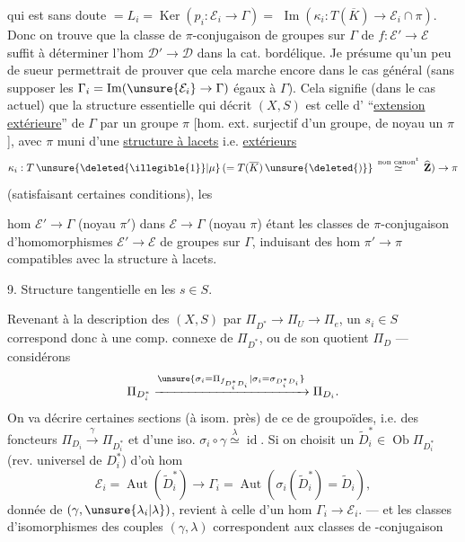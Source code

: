 
qui est sans doute $=L_i=\operatorname{Ker}(p_i:\mathcal{E}_i\to\Gamma)=$  $\operatorname{Im}(\kappa_i:T(\overline{K})\to\mathcal{E}_i\cap\pi)$.
Donc on trouve que  la classe de  $\pi$-conjugaison de groupes sur $\Gamma$ de $f:\mathcal{E}'\to\mathcal{E}$ suffit à déterminer l'hom $\mathcal{D}'\to\mathcal{D}$ dans la cat. bordélique.
Je présume qu'un peu de sueur permettrait de prouver que cela marche encore dans le cas général (sans supposer les $\Gamma_i=\operatorname{Im}(\unsure{\mathcal{E}_i}\to\Gamma)$ égaux à $\Gamma$).
Cela signifie (dans le cas actuel) que la structure essentielle qui décrit $(X,S)$ est celle d' ``\uline{extension extérieure}'' de $\Gamma$ par un groupe $\pi$ [hom. ext. surjectif d'un groupe, de noyau un $\pi$], avec $\pi$ muni d'une \uline{structure à lacets} i.e.   \uline{extérieurs}
\[
\kappa_i:T\,\unsure{\text{\deleted{\illegible{1}}}|\mu}\,(=T(\overline{K})\,\unsure{\text{\deleted{)}}}\,\overset{\text{non canon}^{t}}{\simeq}\,\widehat{\mathbf{Z}})\to\pi
\]
(satisfaisant certaines conditions), les



hom  $\mathcal{E}'\to\Gamma$ (noyau $\pi'$) dans $\mathcal{E}\to\Gamma$ (noyau $\pi$) étant les classes de $\pi$-conjugaison d'homomorphismes $\mathcal{E}'\to\mathcal{E}$ de groupes sur $\Gamma$, induisant des hom $\pi'\to\pi$ compatibles avec la structure à lacets.

9. Structure tangentielle en les $s\in S$.

Revenant à la description  des $(X,S)$ par
$\Pi_{D^*}\to\Pi_U\to\Pi_e$, un $s_i\in S$ correspond donc à une comp. connexe  de $\Pi_{D^*}$, ou  de son quotient $\Pi_D$ --- considérons
\[
\Pi_{D_i^*}\xrightarrow{\unsure{\sigma_i=\Pi_{f_{D_i^*D_i}}|\sigma_i=\sigma_{D_i^*D_i}}}\Pi_{D_i}.
\]
On va décrire certaines sections (à isom. près) de ce   de groupoïdes, i.e. des  foncteurs
$\Pi_{D_i}\xrightarrow{\gamma}\Pi_{D_i^*}$ et d'une iso. $\sigma_i\circ\gamma\overset{\lambda}{\simeq}\operatorname{id}$.
Si on choisit un $\widetilde{D}_i^*\in\operatorname{Ob}\Pi_{D_i^*}$ (rev. universel de $D_i^*$) d'où hom 
\[
\mathcal{E}_i=\operatorname{Aut}(\widetilde{D}_i^*)\to\Gamma_i
=\operatorname{Aut}(\sigma_i(\widetilde{D}_i^*)=\widetilde{D}_i),
\]
  donnée de $(\gamma,\unsure{\lambda_i|\lambda})$,  revient à celle d'un hom $\Gamma_i\to\mathcal{E}_i$.
--- et les classes d'isomorphismes des couples $(\gamma,\lambda)$ correspondent aux classes de -conjugaison

